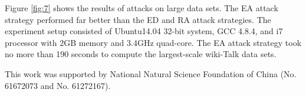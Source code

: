 \documentclass[aps,prl,twocolumn,showpacs,superscriptaddress,groupedaddress]{revtex4}  %
\begin{document}


Figure \ref{fig:7} shows the results of attacks on large data sets. The EA attack strategy performed far better than the ED and RA attack strategies. The experiment setup consisted of Ubuntu14.04 32-bit system, GCC 4.8.4, and i7 processor with 2GB memory and 3.4GHz quad-core. The EA attack strategy took no more than 190 seconds to compute the largest-scale wiki-Talk data sets.




This work was supported by National Natural Science Foundation of
China (No. 61672073 and No. 61272167).




\end{document}
